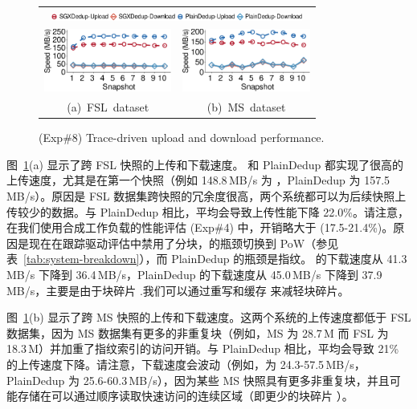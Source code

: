 \begin{figure}[t]
  \centering
  \begin{tabular}{@{\ }c@{\ }c}
  \multicolumn{2}{c}{\includegraphics[width=3.25in]{pic/sgxdedup/expb2_trace_legend.pdf}} \\
  \hspace{-0.1in}
  \includegraphics[width=1.65in]{pic/sgxdedup/expb2_trace_fsl_plain_sgx.pdf} &
  \includegraphics[width=1.65in]{pic/sgxdedup/expb2_trace_ms_plain_sgx.pdf}
  \vspace{-3pt}\\
  \mbox{\small (a) FSL dataset} &
  \mbox{\small (b) MS dataset}
  \end{tabular}
  \vspace{-6pt}
  \caption{(Exp\#8) Trace-driven upload and download performance.}
  \label{fig:tracePerformance}
\end{figure}

图~\ref{fig:tracePerformance}(a) 显示了跨 FSL 快照的上传和下载速度。 \sysname 和 PlainDedup 都实现了很高的上传速度，尤其是在第一个快照（例如 148.8\,MB/s \sysname 为 ，PlainDedup 为 157.5\,MB/s）。原因是 FSL 数据集跨快照的冗余度很高，两个系统都可以为后续快照上传较少的数据。与 PlainDedup 相比，\sysname 平均会导致上传性能下降 22.0\%。请注意，在我们使用合成工作负载的性能评估 (Exp\#4) 中，开销略大于 (17.5-21.4\%)。原因是现在在跟踪驱动评估中禁用了分块，\sysname 的瓶颈切换到 PoW（参见表~\ref{tab:system-breakdown}），而 PlainDedup 的瓶颈是指纹。 \sysname 的下载速度从 41.3\,MB/s 下降到 36.4\,MB/s，PlainDedup 的下载速度从 45.0\,MB/s 下降到 37.9\,MB/s，主要是由于块碎片 \cite{lillibridge13} .我们可以通过重写和缓存 \cite{lillibridge13,cao18} 来减轻块碎片。

图~\ref{fig:tracePerformance}(b) 显示了跨 MS 快照的上传和下载速度。这两个系统的上传速度都低于 FSL 数据集，因为 MS 数据集有更多的非重复块（例如，MS 为 28.7\,M 而 FSL 为 18.3\,M）并加重了指纹索引的访问开销。与 PlainDedup 相比，\sysname 平均会导致 21\% 的上传速度下降。请注意，下载速度会波动（例如，\sysname 为 24.3-57.5\,MB/s，PlainDedup 为 25.6-60.3\,MB/s），因为某些 MS 快照具有更多非重复块，并且可能存储在可以通过顺序读取快速访问的连续区域（即更少的块碎片 \cite{lillibridge13}）。

